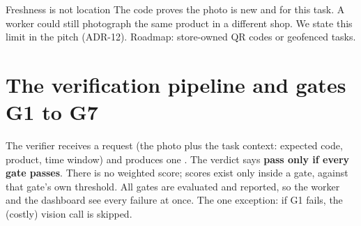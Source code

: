 \begin{warningbox}{Freshness is not location}
The code proves the photo is new and for this task. A worker could still photograph the same product in a different shop. We state this limit in the pitch (ADR-12). Roadmap: store-owned QR codes or geofenced tasks.
\end{warningbox}

\section{The verification pipeline and gates G1 to G7}
The verifier receives a request (the photo plus the task context: expected code, product, time window) and produces one . The verdict says \textbf{pass only if every gate passes}. There is no weighted score; scores exist only inside a gate, against that gate's own threshold. All gates are evaluated and reported, so the worker and the dashboard see every failure at once. The one exception: if G1 fails, the (costly) vision call is skipped.

